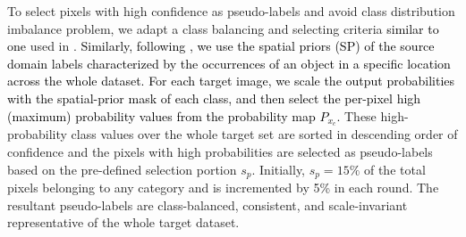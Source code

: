 \documentclass[final,5p,times,twocolumn]{elsarticle}
\begin{document}
To select pixels with high confidence as pseudo-labels and avoid class distribution imbalance problem, we adapt a class balancing and selecting criteria \textcolor{black}{similar to one} used in \cite{zou2019crst}. 
\textcolor{black}{ Similarly, following \cite{zou2018unsupervised, mlsl2020}, we use the spatial priors (SP) of the source domain labels characterized by the occurrences of an object in a specific location across the whole dataset. For each target image, we scale the output probabilities with the spatial-prior mask of each class, and then select the per-pixel high (maximum) probability values from the probability map $P_{x_c}$. }
These high-probability class values over the whole target set are sorted in descending order of confidence and the pixels with high probabilities are selected as pseudo-labels based on the pre-defined selection portion $s_p$.  Initially, $s_p = 15\%$ of the total pixels belonging to any category and is incremented by 5\% in each round. 
The resultant pseudo-labels are class-balanced, consistent, and scale-invariant representative of the whole target dataset. 
\end{document}
